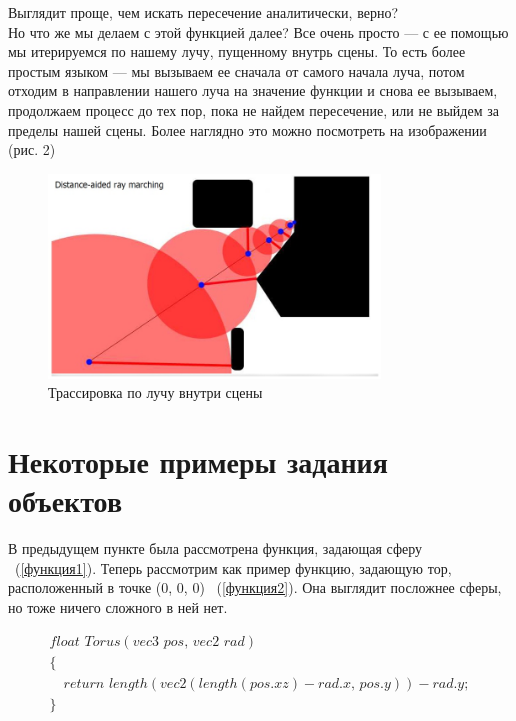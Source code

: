 \documentclass[14pt]{matmex-diploma}
\begin{document}
Выглядит проще, чем искать пересечение аналитически, верно? \\
Но что же мы делаем с этой функцией далее? Все очень просто --- с ее помощью мы итерируемся по нашему лучу,
пущенному внутрь сцены. То есть более простым языком --- мы вызываем ее сначала от самого начала луча, потом отходим
в направлении нашего луча на значение функции и снова ее вызываем, продолжаем процесс до тех пор, пока не найдем пересечение,
или не выйдем за пределы нашей сцены. Более наглядно это можно посмотреть на изображении (рис. 2)

\begin{figure}[t]
\label{ray}
\centering
\includegraphics[width = 250pt]{ray.jpg}
\caption{Трассировка по лучу внутри сцены}
\end{figure}

\section{Некоторые примеры задания объектов}
В предыдущем пункте была рассмотрена функция, задающая сферу ~(\ref{функция1}). Теперь рассмотрим как пример функцию, задающую тор, расположенный в 
точке (0, 0, 0) ~(\ref{функция2}). Она выглядит посложнее сферы, но тоже ничего сложного в ней нет. 

\begin{equation}
\label{функция2}
\begin{array}{ll}
float\,\,Torus(vec3\,\,pos,\, vec2\,\,rad)                                   \\
\{                                                                           \\
\,\,\,\,\,\, return\,\,length(vec2(length(pos.xz) - rad.x,\,pos.y)) - rad.y; \\
\}                                                                           \\
\end{array}
\end{equation}
\end{document}
